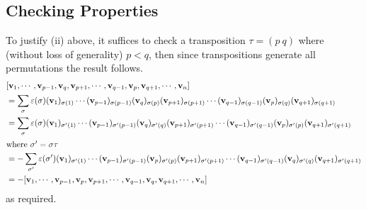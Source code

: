 \subsection{Checking Properties}
To justify (ii) above, it suffices to check a transposition \(\tau = (p\ q)\) where (without loss of generality) \(p < q\), then since transpositions generate all permutations the result follows.
\begin{align*}
	 & [\vb v_1, \cdots, \vb v_{p-1}, \vb v_q, \vb v_{p+1}, \cdots, \vb v_{q-1}, \vb v_p, \vb v_{q+1}, \cdots, \vb v_n]                                                                                                                          \\
	 & = \sum_\sigma \varepsilon(\sigma) (\vb v_1)_{\sigma(1)} \cdots (\vb v_{p-1})_{\sigma(p-1)}(\vb v_q)_{\sigma(p)}(\vb v_{p+1})_{\sigma(p+1)} \cdots (\vb v_{q-1})_{\sigma(q-1)}(\vb v_p)_{\sigma(q)}(\vb v_{q+1})_{\sigma(q+1)}             \\
	 & = \sum_\sigma \varepsilon(\sigma) (\vb v_1)_{\sigma'(1)} \cdots (\vb v_{p-1})_{\sigma'(p-1)}(\vb v_q)_{\sigma'(q)}(\vb v_{p+1})_{\sigma'(p+1)} \cdots (\vb v_{q-1})_{\sigma'(q-1)}(\vb v_p)_{\sigma'(p)}(\vb v_{q+1})_{\sigma'(q+1)}      \\
	\intertext{where \(\sigma' = \sigma\tau\)}
	 & = -\sum_{\sigma'} \varepsilon(\sigma') (\vb v_1)_{\sigma'(1)} \cdots (\vb v_{p-1})_{\sigma'(p-1)}(\vb v_p)_{\sigma'(p)}(\vb v_{p+1})_{\sigma'(p+1)} \cdots (\vb v_{q-1})_{\sigma'(q-1)}(\vb v_q)_{\sigma'(q)}(\vb v_{q+1})_{\sigma'(q+1)} \\
	 & = -[\vb v_1, \cdots, \vb v_{p-1}, \vb v_p, \vb v_{p+1}, \cdots, \vb v_{q-1}, \vb v_q, \vb v_{q+1}, \cdots, \vb v_n]
\end{align*}
as required.

